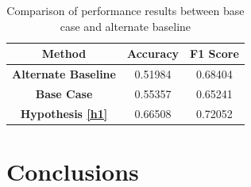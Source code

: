 \documentclass{UoYCSproject}
\begin{document}
\begin{table}[h]
    \centering
    \begin{tabular}{|c|c|c|} \hline
        \textbf{Method} & \textbf{Accuracy} & \textbf{F1 Score} \\ \hline
        \textbf{Alternate Baseline} & 0.51984 & 0.68404 \\
        \textbf{Base Case} & 0.55357 & 0.65241 \\
        \textbf{Hypothesis \ref{h1}} & 0.66508 & 0.72052 \\
        \hline
    \end{tabular}
    \caption{Comparison of performance results between base case and alternate baseline}
    \label{tab:test_results}
\end{table}



\chapter{Conclusions}
\printbibliography
\end{document}
